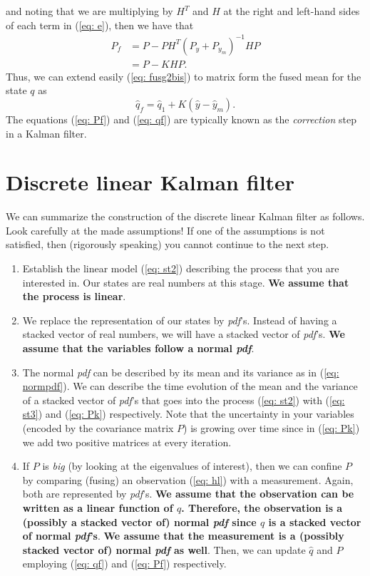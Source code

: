 \documentclass[11pt,a4paper]{article}
\begin{document}
and noting that we are multiplying by $H^T$ and $H$ at the right and left-hand sides of each term in (\ref{eq: e}), then we have that
\begin{align}
	P_f &= P - PH^T(P_y + P_{y_m})^{-1} HP \nonumber \\
	&= P - KHP. \label{eq: Pf}
\end{align}
Thus, we can extend easily (\ref{eq: fusg2bis}) to matrix form the fused mean for the state $q$ as
\begin{equation}
	\hat q_f = \hat q_1 + K(\hat y - \hat y_m).
	\label{eq: qf}
\end{equation}
The equations (\ref{eq: Pf}) and (\ref{eq: qf}) are typically known as the \emph{correction} step in a Kalman filter.

\section{Discrete linear Kalman filter}
\label{sec: dlkf}
We can summarize the construction of the discrete linear Kalman filter as follows. Look carefully at the made assumptions! If one of the assumptions is not satisfied, then (rigorously speaking) you cannot continue to the next step.

\begin{enumerate}
	\item Establish the linear model (\ref{eq: st2}) describing the process that you are interested in. Our states are real numbers at this stage. {\bf We assume that the process is linear}.
	\item We replace the representation of our states by \emph{pdf}'s. Instead of having a stacked vector of real numbers, we will have a stacked vector of \emph{pdf}'s. {\bf We assume that the variables follow a normal \emph{pdf}}.
	\item The normal \emph{pdf} can be described by its mean and its variance as in (\ref{eq: normpdf}). We can describe the time evolution of the mean and the variance of a stacked vector of \emph{pdf}'s that goes into the process (\ref{eq: st2}) with (\ref{eq: st3}) and (\ref{eq: Pk}) respectively. Note that the uncertainty in your variables (encoded by the covariance matrix $P$) is growing over time since in (\ref{eq: Pk}) we add two positive matrices at every iteration.
	\item If $P$ is \emph{big} (by looking at the eigenvalues of interest), then we can confine $P$ by comparing (fusing) an observation (\ref{eq: hl}) with a measurement. Again, both are represented by \emph{pdf}'s. {\bf We assume that the observation can be written as a linear function of $q$. Therefore, the observation is a (possibly a stacked vector of) normal \emph{pdf} since $q$ is a stacked vector of normal \emph{pdf}'s}. {\bf We assume that the measurement is a (possibly stacked vector of) normal \emph{pdf} as well}. Then, we can update $\hat q$ and $P$ employing (\ref{eq: qf}) and (\ref{eq: Pf}) respectively.
\end{enumerate}
\end{document}
